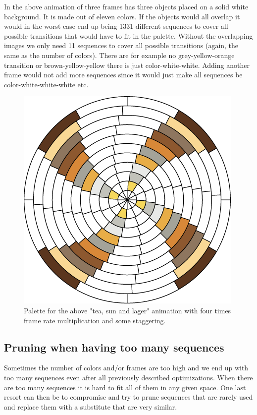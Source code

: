 \documentclass{article}
\begin{document}
In the above animation of three frames has three objects placed on a
solid white background. It is made out of eleven colors. If the objects
would all overlap it would in the worst case end up being 1331 different
sequences to cover all possible transitions that would have to fit in
the palette. Without the overlapping images we only need 11 sequences to
cover all possible transitions (again, the same as the number of
colors). There are for example no grey-yellow-orange transition or
brown-yellow-yellow there is just color-white-white. Adding another
frame would not add more sequences since it would just make all
sequences be color-white-white-white etc.

\begin{figure}[ht!]
\centering
\includegraphics{images/tea-sun-lager-disc.png}
\caption{Palette for the above "tea, sun and lager" animation with four times frame rate multiplication and some staggering.}
\end{figure}



\subsection{Pruning when having too many sequences}

Sometimes the number of colors and/or frames are too high and we end up
with too many sequences even after all previously described
optimizations. When there are too many sequences it is hard to fit all
of them in any given space. One last resort can then be to compromise
and try to prune sequences that are rarely used and replace them with a
substitute that are very similar.
\end{document}
